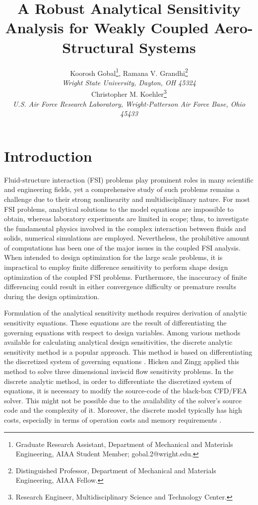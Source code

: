 \documentclass[12pt]{aiaa-pretty}
\author[Gobal, Kohler, and Grandhi]{ %
Koorosh Gobal\thanks{Graduate Research Assistant, Department of Mechanical and Materials Engineering, AIAA Student Member; gobal.2@wright.edu.},
Ramana V. Grandhi\thanks{Distinguished Professor, Department of Mechanical and Materials Engineering, AIAA Fellow.}\\
\textit{Wright State University, Dayton, OH 45324}\\
Christopher M. Koehler\thanks{Research Engineer, Multidisciplinary Science and Technology Center.}\\
\textit{U.S. Air Force Research Laboratory, Wright-Patterson Air Force Base, Ohio 45433}}
\title{A Robust Analytical Sensitivity Analysis for Weakly Coupled Aero-Structural Systems}
\begin{document}
\maketitle
\section{Introduction}
Fluid-structure interaction (FSI) problems play prominent roles in many scientific and engineering fields, yet a comprehensive study of such problems remains a challenge due to their strong nonlinearity and multidisciplinary nature. For most FSI problems, analytical solutions to the model equations are impossible to obtain, whereas laboratory experiments are limited in scope; thus, to investigate the fundamental physics involved in the complex interaction between fluids and solids, numerical simulations are employed. Nevertheless, the prohibitive amount of computations has been one of the major issues in the coupled FSI analysis. When intended to design optimization for the large scale problems, it is impractical to employ finite difference sensitivity to perform shape design optimization of the coupled FSI problems. Furthermore, the inaccuracy of finite differencing could result in either convergence difficulty or premature results during the design optimization.

Formulation of the analytical sensitivity methods requires derivation of analytic sensitivity equations. These equations are the result of differentiating the governing equations with respect to design variables. Among various methods available for calculating analytical design sensitivities, the discrete analytic sensitivity method is a popular approach. This method is based on differentiating the discretized system of governing equations \cite{martins2013review}. Hicken and Zingg \cite{hicken2010induced} applied this method to solve three dimensional inviscid flow sensitivity problems. In the discrete analytic method, in order to differentiate the discretized system of equations, it is necessary to modify the source-code of the black-box CFD/FEA solver. This might not be possible due to the availability of the solver's source code and the complexity of it. Moreover, the discrete model typically has high costs, especially in terms of operation costs and memory requirements \cite{peter2010numerical}.
\end{document}
